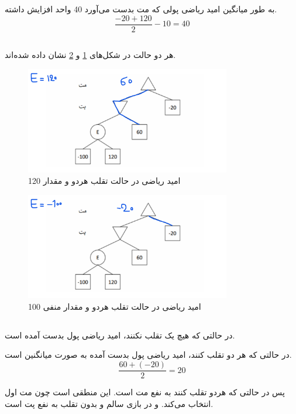 \documentclass{university}
\begin{document}
\subsection{}
به طور میانگین امید ریاضی پولی که مت بدست می‌آورد 40 واحد افزایش داشته.
$$
\frac{-20 + 120}{2} - 10 = 40
$$

\subsection{}
هر دو حالت در شکل‌های 
\ref{fig:eOneHundredTwentyBoth}
و
\ref{fig:minusOneHundredBoth}
نشان داده شده‌اند. 

\begin{figure}[htbp]
    \centering
    \includegraphics[width=0.8\textwidth]{assets/c120.png}
    \caption{امید ریاضی در حالت تقلب هردو و مقدار 120}
    \label{fig:eOneHundredTwentyBoth}
\end{figure}
\begin{figure}[htbp]
    \centering
    \includegraphics[width=0.8\textwidth]{assets/c-100.png}
    \caption{امید ریاضی در حالت تقلب هردو و مقدار منفی 100}
    \label{fig:minusOneHundredBoth}
\end{figure}

\subsection{}
در حالتی که هیچ یک تقلب نکنند، امید ریاضی پول بدست آمده 
است. 

در حالتی که هر دو تقلب کنند، امید ریاضی پول بدست آمده به صورت میانگنین
است.
$$
\frac{60 + (-20)}{2} = 20
$$

پس در حالتی که هردو تقلب کنند به نفع مت است. این منطقی است چون مت اول انتخاب می‌کند.
و در بازی سالم و بدون تقلب به نفع پت است.
\end{document}
